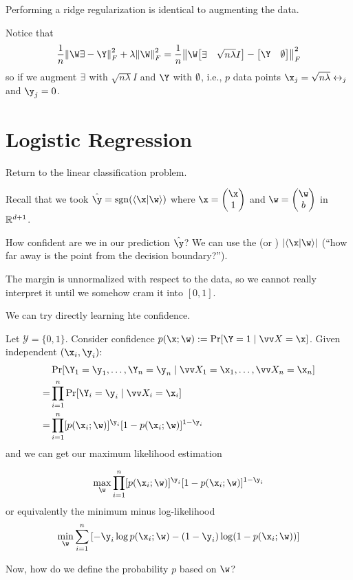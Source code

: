 \documentclass[class=cs480,notes,tikz]{agony}
\begin{document}
\begin{remark}
  Performing a ridge regularization is identical to augmenting the data.
\end{remark}

Notice that
\[
  \frac1n\norm{\W\X-\Y}^2_F + \lambda\norm{\W}^2_F
  = \frac1n\norm{\W\mqty[\X & \sqrt{n\lambda}I] - \mqty[\Y & \0]}^2_F
\]
so if we augment $\exists\!\,$ with $\sqrt{n\lambda}I$ and $\Y$ with $\emptyset$, i.e.,
$p$ data points $\x_j = \sqrt{n\lambda}\e_j$ and $\y_j = 0$.

\section{Logistic Regression}\label{ch:lr}

Return to the linear classification problem.

Recall that we took $\hat{\y} = \sgn(\ip{\x}{\w})$
where $\x = \mqty(\x\\1)$ and $\w = \mqty(\w\\b)$ in $\mathbb{R}^{d+1}$.

How confident are we in our prediction $\hat\y$?
We can use the  (or ) $\abs{\ip{\x}{\w}}$
(``how far away is the point from the decision boundary?'').

The margin is unnormalized with respect to the data,
so we cannot really interpret it until we somehow cram it into $[0,1]$.

We can try directly learning hte confidence.

Let $\mathcal Y = \{0,1\}$.
Consider confidence $p(\x;\w) := \Pr[\Y = 1 \mid \vv X = \x]$.
Given independent $(\x_i,\y_i)$:
\begin{align*}
    & \Pr[\Y_1 = \y_1,\dotsc,\Y_n=\y_n \mid \vv X_1 = \x_1,\dotsc,\vv X_n = \x_n] \\
  = & \prod_{i=1}^n \Pr[\Y_i = \y_i \mid \vv X_i = \x_i]                          \\
  = & \prod_{i=1}^n [p(\x_i;\w)]^{\y_i}[1-p(\x_i;\w)]^{1-\y_i}
\end{align*}
and we can get our maximum likelihood estimation
\begin{defn}
  \[\max_{\w}\prod_{i=1}^n [p(\x_i;\w)]^{\y_i}[1-p(\x_i;\w)]^{1-\y_i} \]
  or equivalently the minimum minus log-likelihood
  \[ \min_{\w}\sum_{i=1}^n\qty[-\y_i\log p(\x_i;\w)-(1-\y_i)\log(1-p(\x_i;\w))] \]
\end{defn}
Now, how do we define the probability $p$ based on $\w$?
\end{document}
